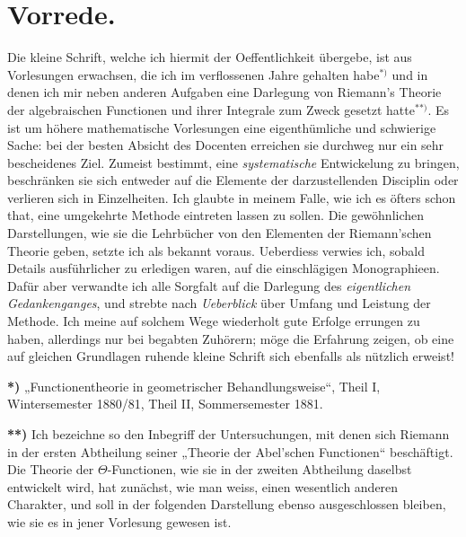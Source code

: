 \documentclass{article}
\begin{document}

\section*{Vorrede.}

Die kleine Schrift, welche ich hiermit der Oeffentlichkeit übergebe, ist aus Vorlesungen erwachsen, die ich im verflossenen Jahre gehalten habe${}^{*)}$ und in denen ich mir neben anderen Aufgaben eine Darlegung von Riemann's Theorie der algebraischen Functionen und ihrer Integrale zum Zweck gesetzt hatte${}^{**)}$. Es ist um höhere mathematische Vorlesungen eine eigenthümliche und schwierige Sache: bei der besten Absicht des Docenten erreichen sie durchweg nur ein sehr bescheidenes Ziel. Zumeist bestimmt, eine \emph{systematische} Entwickelung zu bringen, beschränken sie sich entweder auf die Elemente der darzustellenden Disciplin oder verlieren sich in Einzelheiten. Ich glaubte in meinem Falle, wie ich es öfters schon that, eine umgekehrte Methode eintreten lassen zu sollen. Die gewöhnlichen Darstellungen, wie sie die Lehrbücher von den Elementen der Riemann'schen Theorie geben, setzte ich als bekannt voraus. Ueberdiess verwies ich, sobald Details ausführlicher zu erledigen waren, auf die einschlägigen Monographieen. Dafür aber verwandte ich alle Sorgfalt auf die Darlegung des \emph{eigentlichen Gedankenganges}, und strebte nach \emph{Ueberblick} über Umfang und Leistung der Methode. Ich meine auf solchem Wege wiederholt gute Erfolge errungen zu haben, allerdings nur bei begabten Zuhörern; möge die Erfahrung zeigen, ob eine auf gleichen Grundlagen ruhende kleine Schrift sich ebenfalls als nützlich erweist!

\textbf{*)} „Functionentheorie in geometrischer Behandlungsweise“, Theil I, Wintersemester 1880/81, Theil II, Sommersemester 1881.

\textbf{**)} Ich bezeichne so den Inbegriff der Untersuchungen, mit denen sich Riemann in der ersten Abtheilung seiner „Theorie der Abel'schen Functionen“ beschäftigt. Die Theorie der $\Theta$-Functionen, wie sie in der zweiten Abtheilung daselbst entwickelt wird, hat zunächst, wie man weiss, einen wesentlich anderen Charakter, und soll in der folgenden Darstellung ebenso ausgeschlossen bleiben, wie sie es in jener Vorlesung gewesen ist.

\end{document}
